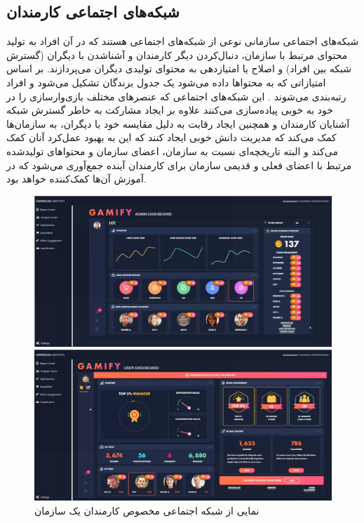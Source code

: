 \subsection{شبکه‌های اجتماعی کارمندان}
\label{sec:socialnetwork}
شبکه‌های اجتماعی سازمانی نوعی از شبکه‌های اجتماعی هستند که در آن افراد به تولید محتوای مرتبط با سازمان، دنبال‌کردن دیگر کارمندان و آشناشدن با دیگران (گسترش شبکه بین افراد) و اصلاح یا امتیازدهی به محتوای تولیدی دیگران می‌پردازند. بر اساس امتیازاتی که به محتواها داده می‌شود یک جدول برندگان تشکیل می‌شود و افراد رتبه‌بندی می‌شوند \cite{sharepoint}.
این شبکه‌های اجتماعی که عنصرهای مختلف بازی‌وارسازی را در خود به خوبی پیاده‌سازی می‌کنند علاوه بر ایجاد مشارکت به خاطر گسترش شبکه آشنایان کارمندان و همچنین ایجاد رقابت به دلیل مقایسه خود با دیگران، به سازمان‌ها کمک می‌کند که مدیریت دانش خوبی ایجاد کنند که این به بهبود عمل‌کرد آنان کمک می‌کند و البته تاریخچه‌ای نسبت به سازمان، اعضای سازمان و محتواهای تولیدشده مرتبط با اعضای فعلی و قدیمی سازمان برای کارمندان آینده جمع‌آوری می‌شود که در آموزش آن‌ها کمک‌کننده خواهد بود.

\begin{figure}[!htb]
	\centering
	\begin{minipage}[b]{0.49\textwidth}
		\includegraphics[width=\textwidth]{Figures/social1.png}
	\end{minipage}
	\begin{minipage}[b]{0.49\textwidth}
		\includegraphics[width=\textwidth]{Figures/social2.png}
	\end{minipage}
	\caption{نمایی از شبکه اجتماعی مخصوص کارمندان یک سازمان\cite{sharepoint}}
\end{figure}

